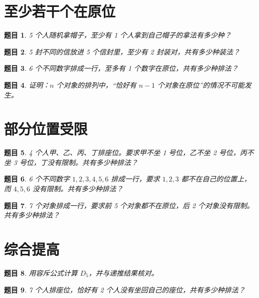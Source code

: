 \documentclass[11pt,a4paper,fontset=fandol]{ctexart}
\theoremstyle{formalexample}
\newtheorem{exercise}{题目}[section]
\begin{document}
\section{至少若干个在原位}

\begin{exercise}
5 个人随机拿帽子，至少有 1 个人拿到自己帽子的拿法有多少种？
\end{exercise}

\begin{exercise}
5 封不同的信放进 5 个信封里，至少有 2 封装对，共有多少种装法？
\end{exercise}

\begin{exercise}
6 个不同数字排成一行，至多有 1 个数字在原位，共有多少种排法？
\end{exercise}

\begin{exercise}
证明：$n$ 个对象的排列中，“恰好有 $n-1$ 个对象在原位”的情况不可能发生。
\end{exercise}

\section{部分位置受限}

\begin{exercise}
4 个人甲、乙、丙、丁排座位。要求甲不坐 1 号位，乙不坐 2 号位，丙不坐 3 号位，丁没有限制。共有多少种排法？
\end{exercise}

\begin{exercise}
6 个不同数字 $1,2,3,4,5,6$ 排成一行，要求 $1,2,3$ 都不在自己的位置上，而 $4,5,6$ 没有限制。共有多少种排法？
\end{exercise}

\begin{exercise}
7 个对象排成一行，要求前 5 个对象都不在原位，后 2 个对象没有限制。共有多少种排法？
\end{exercise}

\section{综合提高}

\begin{exercise}
用容斥公式计算 $D_5$，并与递推结果核对。
\end{exercise}

\begin{exercise}
7 个人排座位，恰好有 2 个人没有坐回自己的座位，共有多少种排法？
\end{exercise}
\end{document}
